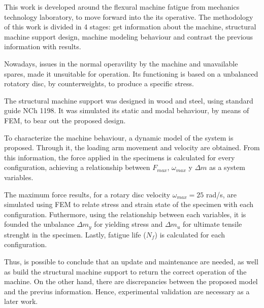 
This work is developed around the flexural machine fatigue from mechanics technology laboratory, to move forward into the its operative. The methodology of this work is divided in 4 stages: get information about the machine, structural machine support design, machine modeling behaviour and contrast the previous information with results.

Nowadays, issues in the normal operavility by the machine and unavailable spares, made it unsuitable for operation. Its functioning is based on a unbalanced rotatory disc, by counterweights, to produce a specific stress.

The structural machine support was designed in wood and steel, using standard guide NCh 1198. It was simulated its static and modal behaviour, by means of FEM, to bear out the proposed design.

To characterize the machine behaviour, a dynamic model of the system is proposed. Through it, the loading arm movement and velocity are obtained. From this information, the force applied in the specimens is calculated for every configuration, achieving a relationship between $F_{max}$, $\omega_{max}$ y $\Delta m$ as a system variables.

The maximum force results, for a rotary disc velocity $\omega_{max}=25$ rad/s, are simulated using FEM to relate stress and strain state of the specimen with each configuration. Futhermore, using the relationship between each variables, it is founded the unbalance $\Delta m_y$ for yielding stress and $\Delta m_u$ for ultimate tensile strenght in the specimen. Lastly, fatigue life ($N_f$) is calculated for each configuration.

Thus, is possible to conclude that an update and maintenance are needed, as well as build the structural machine support to return the correct operation of the machine. On the other hand, there are discrepancies between the proposed model and the previus information. Hence, experimental validation are necessary as a later work.